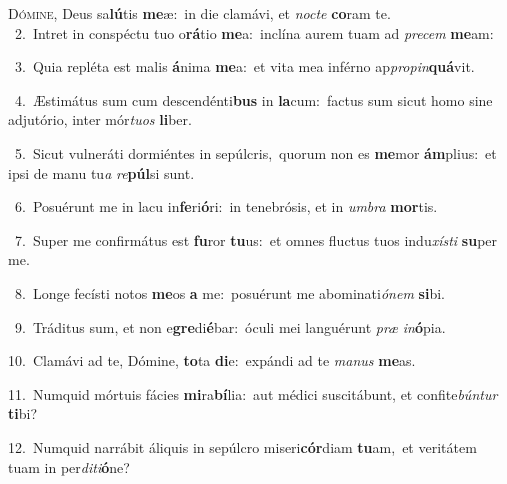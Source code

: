 \lettrine{\initial\textcolor{\initialcolor}{D}}{ómine,} Deus sa\-\textbf{lú}\-tis \textbf{me}\-æ:~\star in die clamávi, et \textit{noc}\-\textit{te} \textbf{co}\-ram te.\\
{\numbfont\textcolor{\numbcolor}{~2.}}~Intret in conspéctu tuo o\-\textbf{rá}\-tio \textbf{me}\-a:~\star inclína aurem tuam ad \textit{pre}\-\textit{cem} \textbf{me}\-am:\par
{\numbfont\textcolor{\numbcolor}{~3.}}~Quia repléta est malis \textbf{á}\-nima \textbf{me}\-a:~\star et vita mea inférno ap\-\textit{pro}\-\textit{pin}\textbf{quá}vit.\par
{\numbfont\textcolor{\numbcolor}{~4.}}~Æstimátus sum cum descendénti\textbf{bus} in \textbf{la}\-cum:~\star factus sum sicut homo sine adjutório, inter mór\-\textit{tu}\-\textit{os} \textbf{li}\-ber.\par
{\numbfont\textcolor{\numbcolor}{~5.}}~Sicut vulneráti dormiéntes in sepúlcris,~\dagger quorum non es \textbf{me}\-mor \textbf{ám}\-plius:~\star et ipsi de manu tu\textit{a} \textit{re}\-\textbf{púl}si sunt.\par
{\numbfont\textcolor{\numbcolor}{~6.}}~Posuérunt me in lacu in\-\textbf{fe}\-ri\-\textbf{ó}\-ri:~\star in tenebrósis, et in \textit{um}\-\textit{bra} \textbf{mor}\-tis.\par
{\numbfont\textcolor{\numbcolor}{~7.}}~Super me confirmátus est \textbf{fu}\-ror \textbf{tu}\-us:~\star et omnes fluctus tuos indu\-\textit{xís}\-\textit{ti} \textbf{su}\-per me.\par
{\numbfont\textcolor{\numbcolor}{~8.}}~Longe fecísti notos \textbf{me}\-os \textbf{a} me:~\star posuérunt me abominati\-\textit{ó}\-\textit{nem} \textbf{si}\-bi.\par
{\numbfont\textcolor{\numbcolor}{~9.}}~Tráditus sum, et non e\-\textbf{gre}\-di\-\textbf{é}\-bar:~\star óculi mei languérunt \textit{præ} \textit{in}\-\textbf{ó}pia.\par
{\numbfont\textcolor{\numbcolor}{10.}}~Clamávi ad te, Dómine, \textbf{to}\-ta \textbf{di}\-e:~\star expándi ad te \textit{ma}\-\textit{nus} \textbf{me}\-as.\par
{\numbfont\textcolor{\numbcolor}{11.}}~Numquid mórtuis fácies \textbf{mi}\-ra\-\textbf{bí}\-lia:~\star aut médici suscitábunt, et confite\-\textit{bún}\-\textit{tur} \textbf{ti}\-bi?\par
{\numbfont\textcolor{\numbcolor}{12.}}~Numquid narrábit áliquis in sepúlcro miseri\-\textbf{cór}\-diam \textbf{tu}\-am,~\star et veritátem tuam in per\-\textit{di}\-\textit{ti}\textbf{ó}ne?\par
